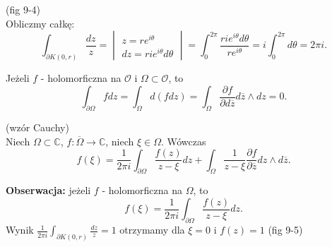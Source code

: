 \documentclass[../main.tex]{subfiles}
\begin{document}
\begin{przyklad}
    (fig 9-4)\\
    Obliczmy całkę:
    \[
        \int_{\partial K(0,r)} \frac{dz}{z} = \begin{vmatrix} z = re^{i\theta}\\ dz = rie^{i\theta}d\theta \end{vmatrix} = \int_0^{2\pi} \frac{rie^{i\theta}d\theta}{re^{i\theta}} = i \int_0^{2\pi}d\theta = 2\pi i
    .\]
\end{przyklad}
\begin{stw}
    Jeżeli $f$ - holomorficzna na $\mathcal{O}$ i $\Omega \subset\mathcal{O}$, to
    \[
        \int_{\partial \Omega} fdz = \int_\Omega d(fdz) = \int_{\Omega} \frac{\partial f}{\partial d\overline{z}} d\overline{z}\land dz = 0
    .\]
\end{stw}
\begin{tw}
    (wzór Cauchy)\\
    Niech $\Omega\subset\mathbb{C}$, $f: \overline{\Omega} \to \mathbb{C}$, niech $\xi \in \Omega$. Wówczas  \[
        f(\xi) = \frac{1}{2\pi i }\int_{\partial \Omega}\frac{f(z)}{z-\xi}dz + \int_{\Omega} \frac{1}{z - \xi}\frac{\partial f}{\partial \overline{z}} dz\land d\overline{z}
    .\]
\end{tw}
\textbf{Obserwacja:} jeżeli $f$ - holomorficzna na $\Omega$, to
\[
    f(\xi) = \frac{1}{2\pi i} \int_{\partial \Omega}\frac{f(z)}{z - \xi} dz
.\]
Wynik $\frac{1}{2\pi i }\int_{\partial K(0,r)} \frac{dz}{z} = 1$ otrzymamy dla $\xi = 0$ i $f(z) = 1$
(fig 9-5)
\end{document}
